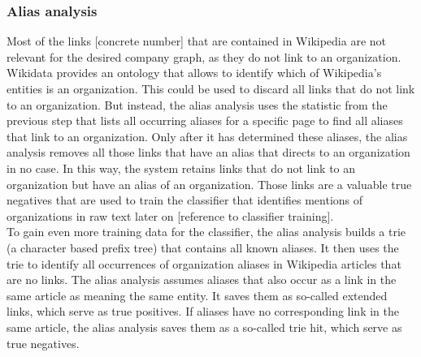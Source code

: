 \subsubsection{Alias analysis}
Most of the links [concrete number] that are contained in Wikipedia are not relevant for the desired company graph, as they do not link to an organization. Wikidata provides an ontology that allows to identify which of Wikipedia's entities is an organization. This could be used to discard all links that do not link to an organization. But instead, the alias analysis uses the statistic from the previous step that lists all occurring aliases for a specific page to find all aliases that link to an organization. Only after it has determined these aliases, the alias analysis removes all those links that have an alias that directs to an organization in no case. In this way, the system retains links that do not link to an organization but have an alias of an organization. Those links are a valuable true negatives that are used to train the classifier that identifies mentions of organizations in raw text later on [reference to classifier training].\\
To gain even more training data for the classifier, the alias analysis builds a trie (a character based prefix tree) that contains all known aliases. It then uses the trie to identify all occurrences of organization aliases in Wikipedia articles that are no links. The alias analysis assumes aliases that also occur as a link in the same article as meaning the same entity. It saves them as so-called extended links, which serve as true positives. If aliases have no corresponding link in the same article, the alias analysis saves them as a so-called trie hit, which serve as true negatives.\\

